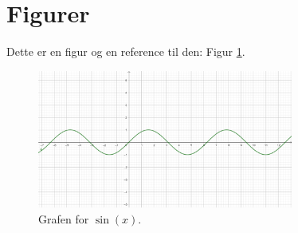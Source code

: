 
\section{Figurer}

Dette er en figur og en reference til den: Figur \ref{fig:sinx}.

\begin{figure}[h]\label{fig:sinx}
\centering
\includegraphics[width=0.75\textwidth]{billeder/sinx.png}
\caption{Grafen for $\sin(x)$.}
\end{figure}

